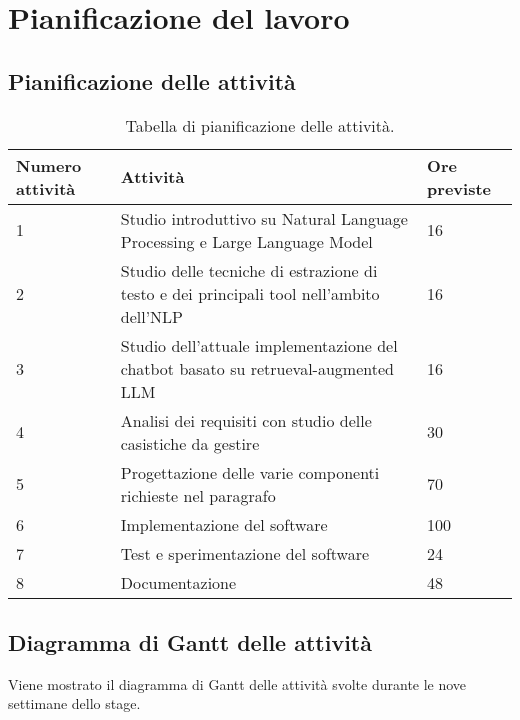 \section{Pianificazione del lavoro}

\subsection{Pianificazione delle attività}
\begin{table}[H]
    \centering
    \begin{tabular}{p{2cm} p{8cm} p{2cm}}
        \hline
        Numero attività & Attività & Ore previste \\
        \hline
        1 & Studio introduttivo su Natural Language Processing e Large Language Model & 16 \\
        \hline
        2 & Studio delle tecniche di estrazione di testo e dei principali tool nell'ambito dell'NLP & 16 \\
        \hline
        3 & Studio dell'attuale implementazione del chatbot basato su retrueval-augmented LLM & 16 \\
        \hline
        4 & Analisi dei requisiti con studio delle casistiche da gestire & 30 \\
        \hline
        5 & Progettazione delle varie componenti richieste nel paragrafo  & 70 \\
        \hline
        6 & Implementazione del software & 100 \\
        \hline
        7 & Test e sperimentazione del software & 24 \\
        \hline
        8 & Documentazione & 48 \\
        \hline
    \end{tabular}
    \caption{Tabella di pianificazione delle attività.}
\end{table}

\subsection{Diagramma di Gantt delle attività}
Viene mostrato il diagramma di Gantt delle attività svolte durante le nove settimane dello stage.

